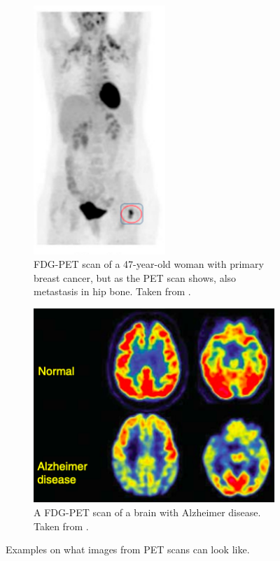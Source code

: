 \documentclass[twoside,english]{uiofysmaster/uiofysmaster}
\begin{document}
\\
\begin{figure}[h!]
\centering
\begin{subfigure}{.5\textwidth}
  \centering
  \includegraphics[width=.4\linewidth]{PET_breastcancer.png}
  \caption{FDG-PET scan of a 47-year-old woman with primary breast cancer, but as the PET scan shows, also metastasis in hip bone. Taken from \cite{PET_breastcanser}.}
  \label{fig:PET_breastcancer}
\end{subfigure}%
\begin{subfigure}{.5\textwidth}
  \centering
  \includegraphics[width=.75\linewidth]{PET_alziemer.png}
  \caption{A FDG-PET scan of a brain with Alzheimer disease. Taken from \cite{PET_alzimer}.}
  \label{fig:PET_alzimer}
\end{subfigure}
\caption{Examples on what images from PET scans can look like.}
\label{fig:FTG-PET}
\end{figure}
\end{document}
